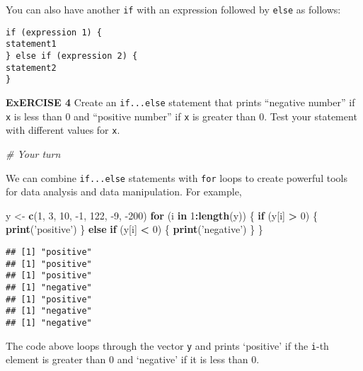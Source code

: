 \documentclass[
]{article}
\newenvironment{Shaded}{\begin{snugshade}}{\end{snugshade}}
\newcommand{\CommentTok}[1]{\textcolor[rgb]{0.56,0.35,0.01}{\textit{#1}}}
\newcommand{\ControlFlowTok}[1]{\textcolor[rgb]{0.13,0.29,0.53}{\textbf{#1}}}
\newcommand{\DecValTok}[1]{\textcolor[rgb]{0.00,0.00,0.81}{#1}}
\newcommand{\KeywordTok}[1]{\textcolor[rgb]{0.13,0.29,0.53}{\textbf{#1}}}
\newcommand{\NormalTok}[1]{#1}
\newcommand{\OperatorTok}[1]{\textcolor[rgb]{0.81,0.36,0.00}{\textbf{#1}}}
\newcommand{\StringTok}[1]{\textcolor[rgb]{0.31,0.60,0.02}{#1}}
\begin{document}
You can also have another \texttt{if} with an expression followed by
\texttt{else} as follows:

\begin{verbatim}
if (expression 1) {
statement1
} else if (expression 2) {
statement2
}
\end{verbatim}

\textbf{ExERCISE 4} Create an \texttt{if...else} statement that prints
``negative number'' if \texttt{x} is less than 0 and ``positive number''
if \texttt{x} is greater than 0. Test your statement with different
values for \texttt{x}.

\begin{Shaded}
\begin{Highlighting}[]
\CommentTok{# Your turn}
\end{Highlighting}
\end{Shaded}

We can combine \texttt{if...else} statements with \texttt{for} loops to
create powerful tools for data analysis and data manipulation. For
example,

\begin{Shaded}
\begin{Highlighting}[]
\NormalTok{y <-}\StringTok{ }\KeywordTok{c}\NormalTok{(}\DecValTok{1}\NormalTok{, }\DecValTok{3}\NormalTok{, }\DecValTok{10}\NormalTok{, }\DecValTok{-1}\NormalTok{, }\DecValTok{122}\NormalTok{, }\DecValTok{-9}\NormalTok{, }\DecValTok{-200}\NormalTok{)}
\ControlFlowTok{for}\NormalTok{ (i }\ControlFlowTok{in} \DecValTok{1}\OperatorTok{:}\KeywordTok{length}\NormalTok{(y)) \{}
  \ControlFlowTok{if}\NormalTok{ (y[i] }\OperatorTok{>}\StringTok{ }\DecValTok{0}\NormalTok{) \{}
  \KeywordTok{print}\NormalTok{(}\StringTok{'positive'}\NormalTok{)}
\NormalTok{  \} }
  \ControlFlowTok{else} \ControlFlowTok{if}\NormalTok{ (y[i] }\OperatorTok{<}\StringTok{ }\DecValTok{0}\NormalTok{) \{}
  \KeywordTok{print}\NormalTok{(}\StringTok{'negative'}\NormalTok{)}
\NormalTok{  \}}
\NormalTok{\}}
\end{Highlighting}
\end{Shaded}

\begin{verbatim}
## [1] "positive"
## [1] "positive"
## [1] "positive"
## [1] "negative"
## [1] "positive"
## [1] "negative"
## [1] "negative"
\end{verbatim}

The code above loops through the vector \texttt{y} and prints `positive'
if the \texttt{i}-th element is greater than 0 and `negative' if it is
less than 0.
\end{document}
